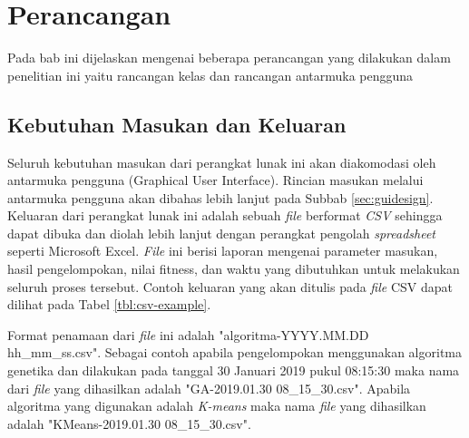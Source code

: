 \chapter{Perancangan}
\label{chap:perancangan}

Pada bab ini dijelaskan mengenai beberapa perancangan yang dilakukan dalam penelitian ini yaitu rancangan kelas dan rancangan antarmuka pengguna

\section{Kebutuhan Masukan dan Keluaran}
Seluruh kebutuhan masukan dari perangkat lunak ini akan diakomodasi oleh antarmuka pengguna (Graphical User Interface). Rincian masukan melalui antarmuka pengguna akan dibahas lebih lanjut pada Subbab \ref{sec:guidesign}. Keluaran dari perangkat lunak ini adalah sebuah \textit{file} berformat \textit{CSV} sehingga dapat dibuka dan diolah lebih lanjut dengan perangkat pengolah \textit{spreadsheet} seperti Microsoft Excel. \textit{File} ini berisi laporan mengenai parameter masukan, hasil pengelompokan, nilai fitness, dan waktu yang dibutuhkan untuk melakukan seluruh proses tersebut. Contoh keluaran yang akan ditulis pada \textit{file} CSV dapat dilihat pada Tabel \ref{tbl:csv-example}. 

Format penamaan dari \textit{file} ini adalah "algoritma-YYYY.MM.DD hh{\_}mm{\_}ss.csv". Sebagai contoh apabila pengelompokan menggunakan algoritma genetika dan dilakukan pada tanggal 30 Januari 2019 pukul 08:15:30 maka nama dari \textit{file} yang dihasilkan adalah "GA-2019.01.30 08{\_}15{\_}30.csv". Apabila algoritma yang digunakan adalah \textit{K-means} maka nama \textit{file} yang dihasilkan adalah "KMeans-2019.01.30 08{\_}15{\_}30.csv".

